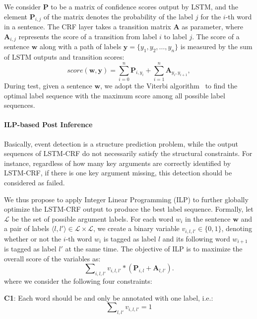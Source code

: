 We consider $\textbf{P}$ to be a matrix of confidence scores output by LSTM, and the element $\textbf{P}_{i,j}$ of the matrix denotes the probability of the label $j$ for the $i$-th word in a sentence. The CRF layer takes a transition matrix $\textbf{A}$ as parameter, where $\textbf{A}_{i,j}$ represents the score of a transition from label $i$ to label $j$. The score of a sentence $\bm{w}$ along with a path of labels $\bm{y} = \{y_1, y_2, \ldots, y_n\}$ is measured by the sum of LSTM outputs and transition scores: 
\begin{equation}
	score(\bm{w}, \bm{y}) = \sum\limits_{i=0}^n\textbf{P}_{i, y_i} + \sum\limits_{i=1}^n\textbf{A}_{y_i, y_{i+1}},
\end{equation}
During test, given a sentence $\bm{w}$, we adopt the Viterbi algorithm~\cite{rabiner1989tutorial} to find the optimal label sequence with the maximum score among all possible label sequences.

\paragraph{ILP-based Post Inference}
Basically, event detection is a structure prediction problem, while the output sequences of LSTM-CRF do not necessarily satisfy the structural constraints. For instance, regardless of how many key arguments are correctly identified by LSTM-CRF, if there is one key argument missing, this detection should be considered as failed. 

We thus propose to apply Integer Linear Programming (ILP) to further globally optimize the LSTM-CRF output  to produce the best label sequence.
Formally, let $\mathcal{L}$ be the set of possible argument labels. For each word $w_i$ in the sentence $\bm{w}$ and a pair of labels $ \langle l, l' \rangle \in \mathcal{L} \times \mathcal{L}$, we create a binary variable ${v_{i,l,l'} \in \{0, 1\}}$, denoting whether or not the $i$-th word $w_i$ is tagged as label $l$ and its following word $w_{i+1}$ is tagged as label $l'$ at the same time. The objective of ILP is to maximize the overall score of the variables as:
\begin{displaymath}
	\sum\nolimits_{i, l, l'}v_{i,l,l'} * (\textbf{P}_{i,l}+\textbf{A}_{l,l'}) .
\end{displaymath}
where we consider the following four constraints:

\textbf{C1}: Each word should be and only be annotated with one label, i.e.:
\begin{equation}
	\sum\nolimits_{l,l'}v_{i,l,l'}=1
\end{equation}

